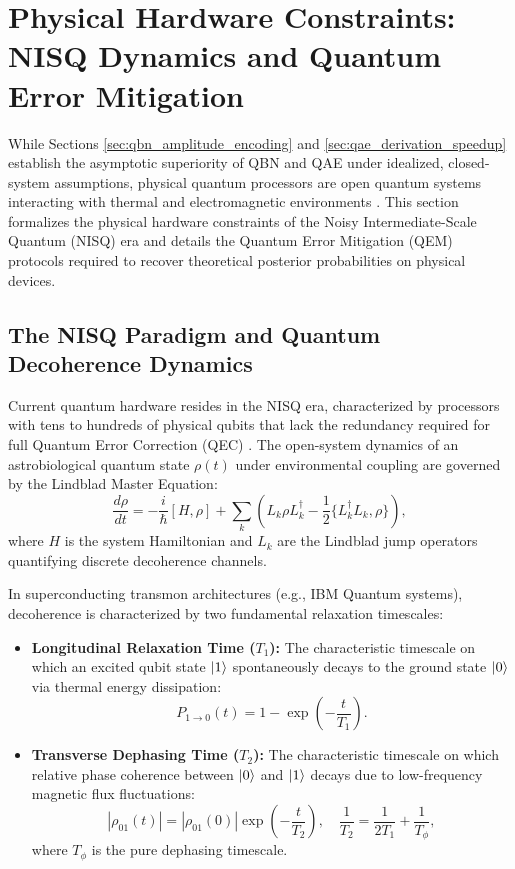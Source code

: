 \section{Physical Hardware Constraints: NISQ Dynamics and Quantum Error Mitigation}\label{sec:nisq_hardware_qem}

While Sections \ref{sec:qbn_amplitude_encoding} and \ref{sec:qae_derivation_speedup} establish the asymptotic superiority of QBN and QAE under idealized, closed-system assumptions, physical quantum processors are open quantum systems interacting with thermal and electromagnetic environments \cite{preskill2018}. This section formalizes the physical hardware constraints of the Noisy Intermediate-Scale Quantum (NISQ) era and details the Quantum Error Mitigation (QEM) protocols required to recover theoretical posterior probabilities on physical devices.

\subsection{The NISQ Paradigm and Quantum Decoherence Dynamics}
Current quantum hardware resides in the NISQ era, characterized by processors with tens to hundreds of physical qubits that lack the redundancy required for full Quantum Error Correction (QEC) \cite{preskill2018}. The open-system dynamics of an astrobiological quantum state $\rho(t)$ under environmental coupling are governed by the Lindblad Master Equation:
\begin{equation}
\frac{d\rho}{dt} = -\frac{i}{\hbar}[H, \rho] + \sum_k \left( L_k \rho L_k^\dagger - \frac{1}{2}\{L_k^\dagger L_k, \rho\} \right),
\label{eq:lindblad_master_equation_ch3}
\end{equation}
where $H$ is the system Hamiltonian and $L_k$ are the Lindblad jump operators quantifying discrete decoherence channels.

In superconducting transmon architectures (e.g., IBM Quantum systems), decoherence is characterized by two fundamental relaxation timescales:
\begin{itemize}
    \item \textbf{Longitudinal Relaxation Time ($T_1$):} The characteristic timescale on which an excited qubit state $\left|1\right\rangle$ spontaneously decays to the ground state $\left|0\right\rangle$ via thermal energy dissipation:
    \begin{equation}
    P_{1\to 0}(t) = 1 - \exp\left(-\frac{t}{T_1}\right).
    \label{eq:t1_relaxation_equation}
    \end{equation}
    \item \textbf{Transverse Dephasing Time ($T_2$):} The characteristic timescale on which relative phase coherence between $\left|0\right\rangle$ and $\left|1\right\rangle$ decays due to low-frequency magnetic flux fluctuations:
    \begin{equation}
    |\rho_{01}(t)| = |\rho_{01}(0)| \exp\left(-\frac{t}{T_2}\right), \quad \frac{1}{T_2} = \frac{1}{2T_1} + \frac{1}{T_\phi},
    \label{eq:t2_dephasing_equation}
    \end{equation}
    where $T_\phi$ is the pure dephasing timescale.
\end{itemize}

